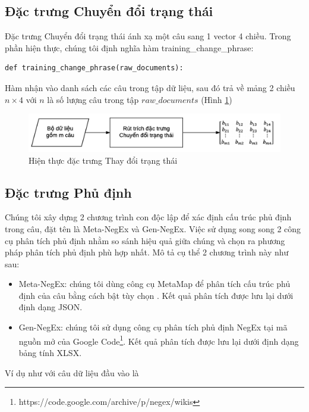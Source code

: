 \subsection*{Đặc trưng Chuyển đổi trạng thái}
Đặc trưng  Chuyển đổi trạng thái ánh xạ một câu sang 1 vector 4 chiều. Trong phần hiện thực, chúng tôi định nghĩa hàm training\_change\_phrase:
\begin{lstlisting}
def training_change_phrase(raw_documents):
\end{lstlisting}
Hàm nhận vào danh sách các câu trong tập dữ liệu, sau đó trả về mảng 2 chiều $n \times 4$ với $n$ là số lượng câu trong tập $raw\_documents$ (Hình \ref{fig:hien-thuc-changephrase})
\begin{figure}[h]
\centering
\includegraphics[scale=0.7]{../hinh/hien_thuc_changephrase.png}
\caption{Hiện thực đặc trưng Thay đổi trạng thái} \label{fig:hien-thuc-changephrase}
\end{figure}
\subsection*{Đặc trưng Phủ định}
Chúng tôi xây dựng 2 chương trình con độc lập để xác định cấu trúc phủ định trong câu, đặt tên là Meta-NegEx và Gen-NegEx. Việc sử dụng song song 2 công cụ phân tích phủ định nhằm so sánh hiệu quả giữa chúng và chọn ra phương pháp phân tích phủ định phù hợp nhất. Mô tả cụ thể 2 chương trình này như sau:
\begin{itemize}
\item Meta-NegEx: chúng tôi dùng công cụ MetaMap để phân tích cấu trúc phủ định của câu bằng cách bật tùy chọn . Kết quả phân tích được lưu lại dưới định dạng JSON.

\item Gen-NegEx: chúng tôi sử dụng công cụ phân tích phủ định NegEx tại mã nguồn mở của Google Code\footnote{https://code.google.com/archive/p/negex/wikis}. Kết quả phân tích được lưu lại dưới định dạng bảng tính XLSX. 
\end{itemize}

Ví dụ như với câu dữ liệu đầu vào là \\

